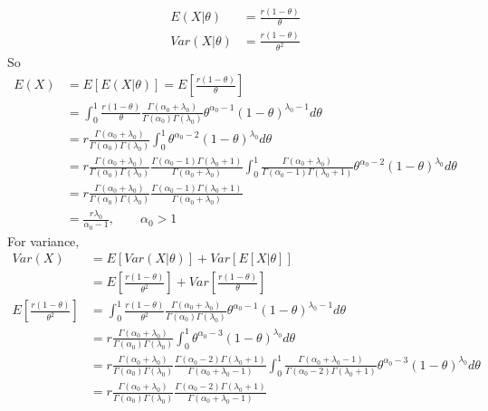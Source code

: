 \begin{itemize}
	\begin{align*}
		E(X|\theta) &= \frac{r(1-\theta)}{\theta} \\
		Var(X|\theta) &=  \frac{r(1-\theta)}{\theta^2} 
	\end{align*}
So
\begin{align*}
	E(X) &= E[E(X|\theta)] = E[\frac{r(1-\theta)}{\theta} ]\\
	&= \int_{0}^{1} \frac{r(1-\theta)}{\theta} \frac{\Gamma(\alpha_0 + \lambda_0)}{\Gamma(\alpha_0) \Gamma(\lambda_0)} \theta^{\alpha_0-1} (1-\theta)^{\lambda_0 -1} d\theta \\
	&=  r \frac{\Gamma(\alpha_0 + \lambda_0)}{\Gamma(\alpha_0) \Gamma(\lambda_0)}  \int_{0}^{1}  \theta^{\alpha_0-2} (1-\theta)^{\lambda_0} d\theta \\
	&= r \frac{\Gamma(\alpha_0 + \lambda_0)}{\Gamma(\alpha_0) \Gamma(\lambda_0)} \frac{\Gamma(\alpha_0 -1) \Gamma(\lambda_0+1) }{\Gamma(\alpha_0 + \lambda_0)} \int_{0}^{1} \frac{\Gamma(\alpha_0 + \lambda_0)}{\Gamma(\alpha_0-1) \Gamma(\lambda_0 +1)}  \theta^{\alpha_0-2} (1-\theta)^{\lambda_0} d\theta \\
	&= r \frac{\Gamma(\alpha_0 + \lambda_0)}{\Gamma(\alpha_0) \Gamma(\lambda_0)} \frac{\Gamma(\alpha_0 -1) \Gamma(\lambda_0+1) }{\Gamma(\alpha_0 + \lambda_0)} \\
	&= \frac{r \lambda_0}{\alpha_0 -1} , \qquad \alpha_0 > 1
\end{align*}
For variance,
\begin{align*}
	Var(X) &= E[Var(X|\theta)] + Var[E[X|\theta]]  \\
	&= E[\frac{r(1-\theta)}{\theta^2} ] + Var[\frac{r(1-\theta)}{\theta} ]\\
	E[\frac{r(1-\theta)}{\theta^2} ] 
	&= \int_{0}^{1} \frac{r(1-\theta)}{\theta^2} \frac{\Gamma(\alpha_0 + \lambda_0)}{\Gamma(\alpha_0) \Gamma(\lambda_0)} \theta^{\alpha_0-1} (1-\theta)^{\lambda_0 -1} d\theta \\
	&=  r \frac{\Gamma(\alpha_0 + \lambda_0)}{\Gamma(\alpha_0) \Gamma(\lambda_0)}  \int_{0}^{1}  \theta^{\alpha_0-3} (1-\theta)^{\lambda_0} d\theta \\
	&= r \frac{\Gamma(\alpha_0 + \lambda_0)}{\Gamma(\alpha_0) \Gamma(\lambda_0)} \frac{\Gamma(\alpha_0 -2) \Gamma(\lambda_0+1) }{\Gamma(\alpha_0 + \lambda_0 -1)} \int_{0}^{1} \frac{\Gamma(\alpha_0 + \lambda_0-1)}{\Gamma(\alpha_0-2) \Gamma(\lambda_0 +1)}  \theta^{\alpha_0-3} (1-\theta)^{\lambda_0} d\theta \\
	&= r \frac{\Gamma(\alpha_0 + \lambda_0)}{\Gamma(\alpha_0) \Gamma(\lambda_0)} \frac{\Gamma(\alpha_0 -2) \Gamma(\lambda_0+1) }{\Gamma(\alpha_0 + \lambda_0-1)} \\

\end{align*}
\end{itemize}
